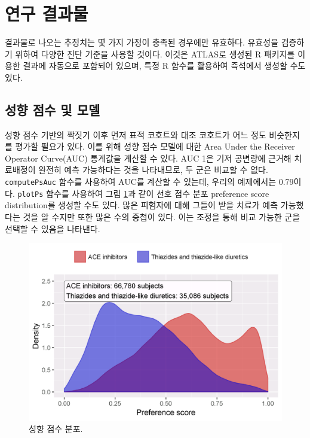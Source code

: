 \documentclass[10.5pt]{book}
\theoremstyle{definition}
\theoremstyle{definition}
\theoremstyle{definition}
\theoremstyle{remark}
\begin{document}
\section{연구 결과물}\label{studyOutputs}

결과물로 나오는 추정치는 몇 가지 가정이 충족된 경우에만 유효하다.
유효성을 검증하기 위하여 다양한 진단 기준을 사용할 것이다. 이것은
ATLAS로 생성된 R 패키지를 이용한 결과에 자동으로 포함되어 있으며, 특정 R
함수를 활용하여 즉석에서 생성할 수도 있다.

\subsection{성향 점수 및 모델}\label{---}

성향 점수 기반의 짝짓기 이후 먼저 표적 코호트와 대조 코호트가 어느 정도
비슷한지를 평가할 필요가 있다. 이를 위해 성향 점수 모델에 대한 Area
Under the Receiver Operator Curve(AUC) 통계값을 계산할 수 있다. AUC 1은
기저 공변량에 근거해 치료배정이 완전히 예측 가능하다는 것을 나타내므로,
두 군은 비교할 수 없다. \texttt{computePsAuc} 함수를 사용하여 AUC를
계산할 수 있는데, 우리의 예제에서는 0.79이다. \texttt{plotPs} 함수를
사용하여 그림 \ref{fig:ps}과 같이 선호 점수 분포 preference score
distribution를 생성할 수도 있다. 많은 피험자에 대해 그들이 받을 치료가
예측 가능했다는 것을 알 수지만 또한 많은 수의 중첩이 있다. 이는 조정을
통해 비교 가능한 군을 선택할 수 있음을 나타낸다.

\begin{figure}

{\centering \includegraphics[width=0.8\linewidth]{images/PopulationLevelEstimation/ps} 

}

\caption{성향 점수 분포.}\label{fig:ps}
\end{figure}
\end{document}
